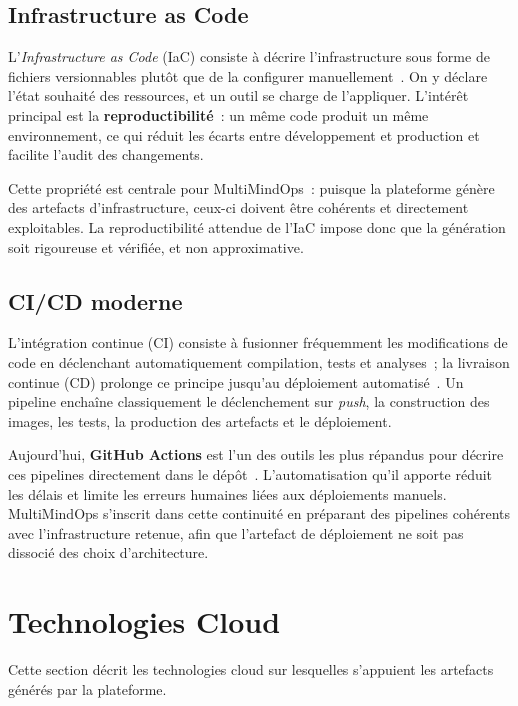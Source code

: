 \subsection{Infrastructure as Code}

L'\textit{Infrastructure as Code} (IaC) consiste à décrire l'infrastructure sous forme de
fichiers versionnables plutôt que de la configurer manuellement~\cite{IAC_MORRIS}. On y
déclare l'état souhaité des ressources, et un outil se charge de l'appliquer. L'intérêt
principal est la \textbf{reproductibilité}~: un même code produit un même environnement, ce
qui réduit les écarts entre développement et production et facilite l'audit des changements.

Cette propriété est centrale pour MultiMindOps~: puisque la plateforme génère des artefacts
d'infrastructure, ceux-ci doivent être cohérents et directement exploitables. La
reproductibilité attendue de l'IaC impose donc que la génération soit rigoureuse et
vérifiée, et non approximative.

\subsection{CI/CD moderne}

L'intégration continue (CI) consiste à fusionner fréquemment les modifications de code en
déclenchant automatiquement compilation, tests et analyses~; la livraison continue (CD)
prolonge ce principe jusqu'au déploiement automatisé~\cite{DEVOPS_HANDBOOK}. Un pipeline
enchaîne classiquement le déclenchement sur \textit{push}, la construction des images, les
tests, la production des artefacts et le déploiement.

Aujourd'hui, \textbf{GitHub Actions} est l'un des outils les plus répandus pour décrire ces
pipelines directement dans le dépôt~\cite{GITHUB_ACTIONS_DOCS}. L'automatisation qu'il
apporte réduit les délais et limite les erreurs humaines liées aux déploiements manuels.
MultiMindOps s'inscrit dans cette continuité en préparant des pipelines cohérents avec
l'infrastructure retenue, afin que l'artefact de déploiement ne soit pas dissocié des choix
d'architecture.

\section{Technologies Cloud}

Cette section décrit les technologies cloud sur lesquelles s'appuient les artefacts générés
par la plateforme.

